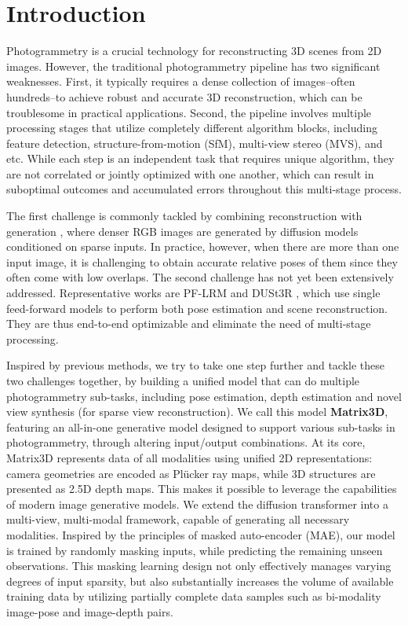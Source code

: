 \section{Introduction}
\label{sec:intro}

Photogrammetry is a crucial technology for reconstructing 3D scenes from 2D images. However, the traditional photogrammetry pipeline has two significant weaknesses. First, it typically requires a dense collection of images--often hundreds--to achieve robust and accurate 3D reconstruction, which can be troublesome in practical applications. Second, the pipeline involves multiple processing stages that utilize completely different algorithm blocks, including feature detection, structure-from-motion (SfM), multi-view stereo (MVS), and etc. While each step is an independent task that requires unique algorithm, they are not correlated or jointly optimized with one another, which can result in suboptimal outcomes and accumulated errors throughout this multi-stage process.

The first challenge is commonly tackled by combining reconstruction with generation \cite{shi2023mvdream, li2023instant3d, wu2024reconfusion, gao2024cat3d}, where denser RGB images are generated by diffusion models conditioned on sparse inputs. In practice, however, when there are more than one input image, it is challenging to obtain accurate relative poses of them since they often come with low overlaps. The second challenge has not yet been extensively addressed. Representative works are PF-LRM \cite{wang2023pf} and DUSt3R \cite{wang2024dust3r}, which use single feed-forward models to perform both pose estimation and scene reconstruction. They are thus end-to-end optimizable and eliminate the need of multi-stage processing.

Inspired by previous methods, we try to take one step further and tackle these two challenges together, by building a unified model that can do multiple photogrammetry sub-tasks, including pose estimation, depth estimation and novel view synthesis (for sparse view reconstruction). We call this model \textbf{Matrix3D}, featuring an all-in-one generative model designed to support various sub-tasks in photogrammetry, through altering input/output combinations.
At its core, Matrix3D represents data of all modalities using unified 2D representations: camera geometries are encoded as Plücker ray maps, while 3D structures are presented as 2.5D depth maps. This makes it possible to leverage the capabilities of modern image generative models. 
We extend the diffusion transformer into a multi-view, multi-modal framework, capable of generating all necessary modalities. Inspired by the principles of masked auto-encoder (MAE), our model is trained by randomly masking inputs, while predicting the remaining unseen observations.
This masking learning design not only effectively manages varying degrees of input sparsity, but also substantially increases the volume of available training data by utilizing partially complete data samples such as bi-modality image-pose and image-depth pairs. 


